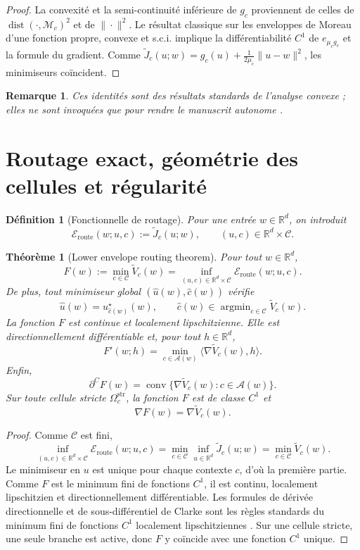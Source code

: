 \documentclass[11pt,a4paper]{article}
\newtheorem{definition}{Définition}[section]
\newtheorem{theorem}{Théorème}[section]
\newtheorem{remark}{Remarque}[section]
\DeclareMathOperator{\argmin}{argmin}
\DeclareMathOperator{\dist}{dist}
\DeclareMathOperator{\conv}{conv}
\newcommand{\R}{\mathbb R}
\newcommand{\Mcal}{\mathcal M}
\newcommand{\Ccal}{\mathcal C}
\newcommand{\Acal}{\mathcal A}
\begin{document}
\begin{proof}
La convexité et la semi-continuité inférieure de \(g_c\) proviennent de celles de \(\dist(\cdot,\Mcal_c)^2\) et de \(\|\cdot\|^2\). Le résultat classique sur les enveloppes de Moreau d'une fonction propre, convexe et s.c.i. implique la différentiabilité \(C^1\) de \(e_{\mu_c g_c}\) et la formule du gradient. Comme \(\widetilde J_c(u;w)=g_c(u)+\frac{1}{2\mu_c}\|u-w\|^2\), les minimiseurs coïncident.
\end{proof}

\begin{remark}
Ces identités sont des résultats standards de l'analyse convexe ; elles ne sont invoquées que pour rendre le manuscrit autonome \cite{Moreau1965,Rockafellar1970,BauschkeCombettes2017,RockafellarWets1998}.
\end{remark}

\section{Routage exact, géométrie des cellules et régularité}

\begin{definition}[Fonctionnelle de routage]
Pour une entrée \(w\in\R^d\), on introduit
\[
\mathcal E_{\mathrm{route}}(w;u,c):=\widetilde J_c(u;w),
\qquad (u,c)\in\R^d\times\Ccal.
\]
\end{definition}

\begin{theorem}[Lower envelope routing theorem]
Pour tout \(w\in\R^d\),
\[
F(w):=\min_{c\in\Ccal}\widetilde V_c(w)
=
\inf_{(u,c)\in\R^d\times\Ccal}\mathcal E_{\mathrm{route}}(w;u,c).
\]
De plus, tout minimiseur global \((\hat u(w),\hat c(w))\) vérifie
\[
\hat u(w)=u_{\hat c(w)}^\star(w),
\qquad
\hat c(w)\in\argmin_{c\in\Ccal}\widetilde V_c(w).
\]
La fonction \(F\) est continue et localement lipschitzienne. Elle est directionnellement différentiable et, pour tout \(h\in\R^d\),
\[
F'(w;h)=\min_{c\in\Acal(w)}\langle \nabla \widetilde V_c(w),h\rangle.
\]
Enfin,
\[
\partial^C F(w)=\conv\{\nabla \widetilde V_c(w): c\in\Acal(w)\}.
\]
Sur toute cellule stricte \(\Omega_c^{\mathrm{str}}\), la fonction \(F\) est de classe \(C^1\) et
\[
\nabla F(w)=\nabla \widetilde V_c(w).
\]
\end{theorem}

\begin{proof}
Comme \(\Ccal\) est fini,
\[
\inf_{(u,c)\in\R^d\times\Ccal}\mathcal E_{\mathrm{route}}(w;u,c)
=
\min_{c\in\Ccal}\inf_{u\in\R^d}\widetilde J_c(u;w)
=
\min_{c\in\Ccal}\widetilde V_c(w).
\]
Le minimiseur en \(u\) est unique pour chaque contexte \(c\), d'où la première partie. Comme \(F\) est le minimum fini de fonctions \(C^1\), il est continu, localement lipschitzien et directionnellement différentiable. Les formules de dérivée directionnelle et de sous-différentiel de Clarke sont les règles standards du minimum fini de fonctions \(C^1\) localement lipschitziennes \cite{Clarke1983}. Sur une cellule stricte, une seule branche est active, donc \(F\) y coïncide avec une fonction \(C^1\) unique.
\end{proof}
\end{document}
